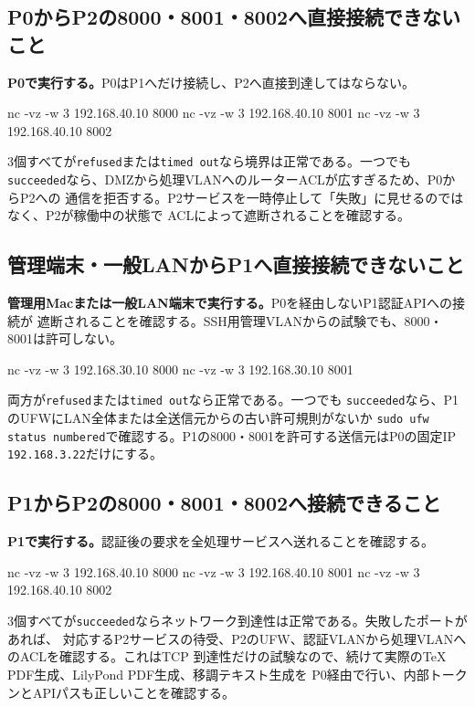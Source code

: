 \documentclass[uplatex,a4paper,11pt]{jsarticle}
\begin{document}
\subsection{P0からP2の8000・8001・8002へ直接接続できないこと}

\textbf{P0で実行する。}P0はP1へだけ接続し、P2へ直接到達してはならない。

\begin{command}
nc -vz -w 3 192.168.40.10 8000
nc -vz -w 3 192.168.40.10 8001
nc -vz -w 3 192.168.40.10 8002
\end{command}

3個すべてが\texttt{refused}または\texttt{timed out}なら境界は正常である。一つでも
\texttt{succeeded}なら、DMZから処理VLANへのルーターACLが広すぎるため、P0からP2への
通信を拒否する。P2サービスを一時停止して「失敗」に見せるのではなく、P2が稼働中の状態で
ACLによって遮断されることを確認する。

\subsection{管理端末・一般LANからP1へ直接接続できないこと}

\textbf{管理用Macまたは一般LAN端末で実行する。}P0を経由しないP1認証APIへの接続が
遮断されることを確認する。SSH用管理VLANからの試験でも、8000・8001は許可しない。

\begin{command}
nc -vz -w 3 192.168.30.10 8000
nc -vz -w 3 192.168.30.10 8001
\end{command}

両方が\texttt{refused}または\texttt{timed out}なら正常である。一つでも
\texttt{succeeded}なら、P1のUFWにLAN全体または全送信元からの古い許可規則がないか
\texttt{sudo ufw status numbered}で確認する。P1の8000・8001を許可する送信元はP0の固定IP
\texttt{192.168.3.22}だけにする。

\subsection{P1からP2の8000・8001・8002へ接続できること}

\textbf{P1で実行する。}認証後の要求を全処理サービスへ送れることを確認する。

\begin{command}
nc -vz -w 3 192.168.40.10 8000
nc -vz -w 3 192.168.40.10 8001
nc -vz -w 3 192.168.40.10 8002
\end{command}

3個すべてが\texttt{succeeded}ならネットワーク到達性は正常である。失敗したポートがあれば、
対応するP2サービスの待受、P2のUFW、認証VLANから処理VLANへのACLを確認する。これはTCP
到達性だけの試験なので、続けて実際のTeX PDF生成、LilyPond PDF生成、移調テキスト生成を
P0経由で行い、内部トークンとAPIパスも正しいことを確認する。
\end{document}
